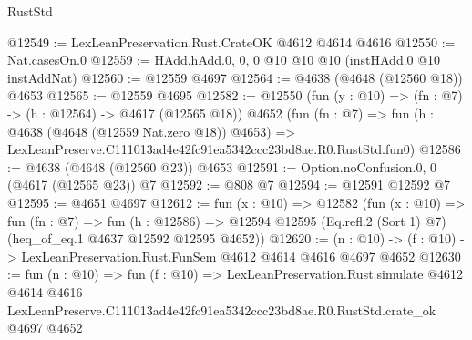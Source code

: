\begin{lexlean}{RustStd}
\begin{coremodule}
@12549 := LexLeanPreservation.Rust.CrateOK @4612 @4614 @4616
@12550 := Nat.casesOn.{0}
@12559 := HAdd.hAdd.{0, 0, 0} @10 @10 @10 (instHAdd.{0} @10 instAddNat)
@12560 := @12559 @4697
@12564 := @4638 (@4648 (@12560 @18)) @4653
@12565 := @12559 @4695
@12582 := @12550
    (fun (y : @10) => (fn : @7) -> (h : @12564) -> @4617 (@12565 @18))
    @4652
    (fun (fn : @7) =>
    fun (h : @4638 (@4648 (@12559 Nat.zero @18)) @4653) =>
    LexLeanPreserve.C111013ad4e42fc91ea5342ccc23bd8ae.R0.RustStd.fun0)
@12586 := @4638 (@4648 (@12560 @23)) @4653
@12591 := Option.noConfusion.{0, 0} (@4617 (@12565 @23)) @7
@12592 := @808 @7
@12594 := @12591 @12592 @7
@12595 := @4651 @4697
@12612 := fun (x : @10) =>
  @12582
    (fun (x : @10) =>
    fun (fn : @7) =>
    fun (h : @12586) =>
    @12594 @12595 (Eq.refl.{2} (Sort 1) @7) (heq_of_eq.{1} @4637 @12592 @12595 @4652))
@12620 := (n : @10) -> (f : @10) -> LexLeanPreservation.Rust.FunSem @4612 @4614 @4616 @4697 @4652
@12630 := fun (n : @10) =>
  fun (f : @10) =>
  LexLeanPreservation.Rust.simulate
    @4612
    @4614
    @4616
    LexLeanPreserve.C111013ad4e42fc91ea5342ccc23bd8ae.R0.RustStd.crate_ok
    @4697
    @4652
\end{coremodule}
\end{lexlean}
